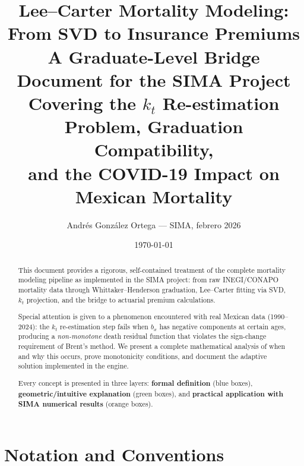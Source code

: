 \documentclass[11pt,a4paper]{article}
\title{\textbf{Lee--Carter Mortality Modeling: \\
From SVD to Insurance Premiums} \\[0.5em]
\large A Graduate-Level Bridge Document for the SIMA Project \\[0.3em]
\normalsize Covering the $k_t$ Re-estimation Problem, Graduation Compatibility, \\
and the COVID-19 Impact on Mexican Mortality}
\author{Andr\'{e}s Gonz\'{a}lez Ortega --- SIMA, febrero 2026}
\date{\today}
\theoremstyle{definition}
\begin{document}
\maketitle

\begin{abstract}
This document provides a rigorous, self-contained treatment of the complete
mortality modeling pipeline as implemented in the SIMA project: from raw
INEGI/CONAPO mortality data through Whittaker--Henderson graduation,
Lee--Carter fitting via SVD, $k_t$ projection, and the bridge to actuarial
premium calculations.

Special attention is given to a phenomenon encountered with real Mexican
data (1990--2024): the $k_t$ re-estimation step fails when $b_x$ has
negative components at certain ages, producing a \emph{non-monotone} death
residual function that violates the sign-change requirement of Brent's
method. We present a complete mathematical analysis of when and why this
occurs, prove monotonicity conditions, and document the adaptive solution
implemented in the engine.

Every concept is presented in three layers: \textbf{formal definition}
(blue boxes), \textbf{geometric/intuitive explanation} (green boxes), and
\textbf{practical application with SIMA numerical results} (orange boxes).
\end{abstract}

\tableofcontents
\newpage

\section{Notation and Conventions}
\end{document}
